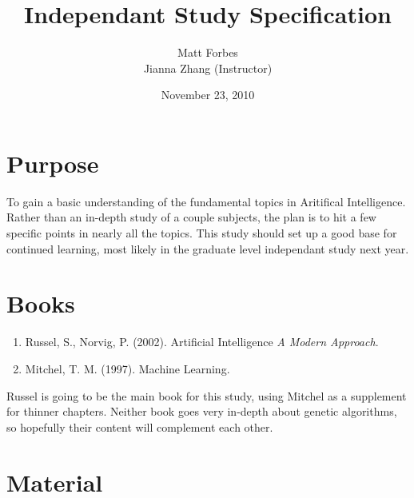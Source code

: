 \documentclass[a4paper,12pt]{article}
\begin{document}
\title{Independant Study Specification}
\author{Matt Forbes \\ Jianna Zhang (Instructor)}
\date{November 23, 2010}
\maketitle

\section*{Purpose}
To gain a basic understanding of the fundamental topics in Aritifical
Intelligence. Rather than an in-depth study of a couple subjects, the
plan is to hit a few specific points in nearly all the topics. This
study should set up a good base for continued learning, most likely in
the graduate level independant study next year.

\section*{Books}

\begin{enumerate}[1)]

\item Russel, S., Norvig, P. (2002). Artificial Intelligence {\it A Modern Approach}.
\item Mitchel, T. M. (1997). Machine Learning.
  
\end{enumerate}

Russel is going to be the main book for this study, using Mitchel as a
supplement for thinner chapters. Neither book goes very in-depth about
genetic algorithms, so hopefully their content will complement each other.

\section*{Material}
\end{document}

